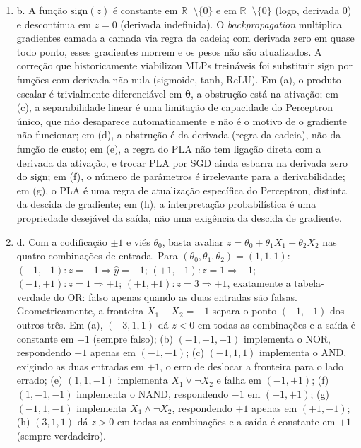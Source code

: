 \documentclass{dlproblemset}
\begin{document}
\begin{enumerate}[1)]
    \item b. A função $\mathrm{sign}(z)$ é constante em $\mathbb{R}^- \setminus \{0\}$ e em $\mathbb{R}^+ \setminus \{0\}$ (logo, derivada $0$) e descontínua em $z = 0$ (derivada indefinida). O \textit{backpropagation} multiplica gradientes camada a camada via regra da cadeia; com derivada zero em quase todo ponto, esses gradientes morrem e os pesos não são atualizados. A correção que historicamente viabilizou MLPs treináveis foi substituir $\mathrm{sign}$ por funções com derivada não nula (sigmoide, tanh, ReLU). Em (a), o produto escalar é trivialmente diferenciável em $\boldsymbol{\theta}$, a obstrução está na ativação; em (c), a separabilidade linear é uma limitação de capacidade do Perceptron único, que não desaparece automaticamente e não é o motivo de o gradiente não funcionar; em (d), a obstrução é da derivada (regra da cadeia), não da função de custo; em (e), a regra do PLA não tem ligação direta com a derivada da ativação, e trocar PLA por SGD ainda esbarra na derivada zero do $\mathrm{sign}$; em (f), o número de parâmetros é irrelevante para a derivabilidade; em (g), o PLA é uma regra de atualização específica do Perceptron, distinta da descida de gradiente; em (h), a interpretação probabilística é uma propriedade desejável da saída, não uma exigência da descida de gradiente.

    \item d. Com a codificação $\pm 1$ e viés $\theta_0$, basta avaliar $z = \theta_0 + \theta_1 X_1 + \theta_2 X_2$ nas quatro combinações de entrada. Para $(\theta_0, \theta_1, \theta_2) = (1, 1, 1)$: $(-1,-1)\!: z = -1 \Rightarrow \hat{y} = -1$; $(+1,-1)\!: z = 1 \Rightarrow +1$; $(-1,+1)\!: z = 1 \Rightarrow +1$; $(+1,+1)\!: z = 3 \Rightarrow +1$, exatamente a tabela-verdade do OR: falso apenas quando as duas entradas são falsas. Geometricamente, a fronteira $X_1 + X_2 = -1$ separa o ponto $(-1,-1)$ dos outros três. Em (a), $(-3, 1, 1)$ dá $z < 0$ em todas as combinações e a saída é constante em $-1$ (sempre falso); (b) $(-1, -1, -1)$ implementa o NOR, respondendo $+1$ apenas em $(-1,-1)$; (c) $(-1, 1, 1)$ implementa o AND, exigindo as duas entradas em $+1$, o erro de deslocar a fronteira para o lado errado; (e) $(1, 1, -1)$ implementa $X_1 \lor \lnot X_2$ e falha em $(-1, +1)$; (f) $(1, -1, -1)$ implementa o NAND, respondendo $-1$ em $(+1,+1)$; (g) $(-1, 1, -1)$ implementa $X_1 \land \lnot X_2$, respondendo $+1$ apenas em $(+1,-1)$; (h) $(3, 1, 1)$ dá $z > 0$ em todas as combinações e a saída é constante em $+1$ (sempre verdadeiro).


\end{enumerate}
\end{document}
